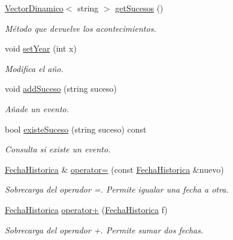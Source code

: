 \begin{DoxyCompactItemize}
\hyperlink{classVectorDinamico}{Vector\+Dinamico}$<$ string $>$ \hyperlink{classFechaHistorica_a6e2e1ba20212a9d252271b533a259636}{get\+Sucesos} ()
\begin{DoxyCompactList}\small\item\em Método que devuelve los acontecimientos. \end{DoxyCompactList}\item 
void \hyperlink{classFechaHistorica_a82780229e85e6647f59bcf23115d155e}{set\+Year} (int x)
\begin{DoxyCompactList}\small\item\em Modifica el año. \end{DoxyCompactList}\item 
void \hyperlink{classFechaHistorica_a4a6640c33a0662558b9eedbcc15dfa9c}{add\+Suceso} (string suceso)
\begin{DoxyCompactList}\small\item\em Añade un evento. \end{DoxyCompactList}\item 
bool \hyperlink{classFechaHistorica_a4797dd16e39a00d6390138c56974b6d7}{existe\+Suceso} (string suceso) const
\begin{DoxyCompactList}\small\item\em Consulta si existe un evento. \end{DoxyCompactList}\item 
\hyperlink{classFechaHistorica}{Fecha\+Historica} \& \hyperlink{classFechaHistorica_ae7cf51e42c94b39ee8a35840a86bc8e4}{operator=} (const \hyperlink{classFechaHistorica}{Fecha\+Historica} \&nuevo)
\begin{DoxyCompactList}\small\item\em Sobrecarga del operador =. Permite igualar una fecha a otra. \end{DoxyCompactList}\item 
\hyperlink{classFechaHistorica}{Fecha\+Historica} \hyperlink{classFechaHistorica_a6c9e0799d9c70e9ef5e76abe2894f374}{operator+} (\hyperlink{classFechaHistorica}{Fecha\+Historica} f)
\begin{DoxyCompactList}\small\item\em Sobrecarga del operador +. Permite sumar dos fechas. \end{DoxyCompactList}\end{DoxyCompactItemize}
